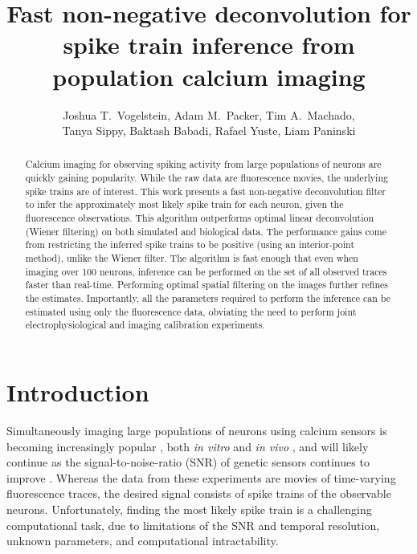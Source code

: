 \documentclass{article}
\title{Fast non-negative deconvolution for spike train inference from population calcium imaging}
\author{Joshua T.~Vogelstein, Adam M.~Packer, Tim A.~Machado, \\ Tanya Sippy, Baktash Babadi, Rafael Yuste, Liam Paninski}
\begin{document}
\maketitle
\begin{abstract}
Calcium imaging for observing spiking activity from large populations of neurons are quickly gaining popularity.  While the raw data are fluorescence movies, the underlying spike trains are of interest.  This work presents a fast non-negative deconvolution filter to infer the approximately most likely spike train for each neuron, given the fluorescence observations. This algorithm outperforms optimal linear deconvolution (Wiener filtering) on both simulated and biological data. The performance gains come from restricting the inferred spike trains to be positive (using an interior-point method), unlike the Wiener filter.  The algorithm is fast enough that even when imaging over 100 neurons, inference can be performed on the set of all observed traces faster than real-time.  Performing optimal spatial filtering on the images further refines the estimates.  Importantly, all the parameters required to perform the inference can be estimated using only the fluorescence data, obviating the need to perform joint electrophysiological and imaging calibration experiments.
\end{abstract}


\section{Introduction}


Simultaneously imaging large populations of neurons using calcium sensors is becoming increasingly popular \cite{ImagingManual}, both \emph{in vitro} \cite{SmettersYuste99, IkegayaYuste04} and \emph{in vivo} \cite{NagayamaChen07, GobelHelmchen07, LuoSvoboda08}, and will likely continue as the signal-to-noise-ratio (SNR) of genetic sensors continues to improve \cite{GaraschukKonnerth07, MankGriesbeck08b, WallaceHasan08}. 
Whereas the data from these experiments are movies of time-varying fluorescence traces, the desired signal consists of spike trains of the observable neurons. Unfortunately, finding the most likely spike train is a challenging computational task, due to limitations of the SNR and temporal resolution, unknown parameters, and computational intractability. %
\end{document}
